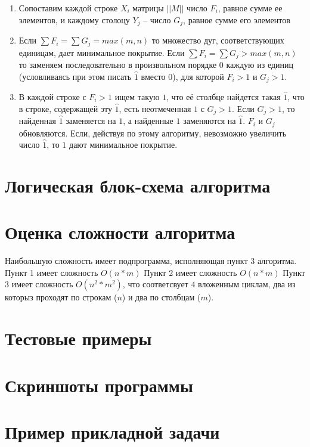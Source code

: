 \documentclass[12pt]{article}
\begin{document}
\begin{enumerate}
    \item Сопоставим каждой строке $X_i$ матрицы $||M||$
          число $F_i$, равное сумме ее элементов,
          и каждому столоцу $Y_j$ – число $G_j$, равное сумме
          его элементов
    \item Если $\sum F_i = \sum G_j = max(m, n)$ то
          множество дуг, соответствующих единицам,
          дает минимальное покрытие. Если
          $\sum F_i = \sum G_j > max(m, n)$
          то заменяем последовательно
          в произвольном порядке $0$ каждую из единиц
          (условливаясь при этом писать $\widehat{1}$ вместо $0$),
          для которой $F_i > 1$ и $G_j > 1$.
    \item В каждой строке с $F_i > 1$ ищем такую
          $1$, что её столбце найдется
          такая $\widehat{1}$, что в строке,
          содержащей эту $\widehat{1}$, есть неотмеченная $1$
          с $G_j > 1$. Если $G_j > 1$, то найденная $\widehat{1}$
          заменяется на $1$, а найденные $1$ заменяются на
          $\widehat{1}$. $F_i$ и $G_j$ обновляются.
          Если, действуя по этому алгоритму,
          невозможно увеличить число $\widehat{1}$,
          то $1$ дают минимальное покрытие.
\end{enumerate}

\section{Логическая блок-схема алгоритма}

\section{Оценка сложности алгоритма}

Наибольшую сложность имеет подпрограмма, исполняющая
пункт 3 алгоритма. Пункт 1 имеет сложность $O(n * m)$
Пункт 2 имеет сложность $O(n * m)$
Пункт 3 имеет сложность $O(n^2 * m^2)$, что соответсвует $4$
вложенным циклам, два из которыз проходят по строкам ($n$) и
два по столбцам ($m$).

\section{Тестовые примеры}

\section{Скриншоты программы}

\section{Пример прикладной задачи}
\end{document}
